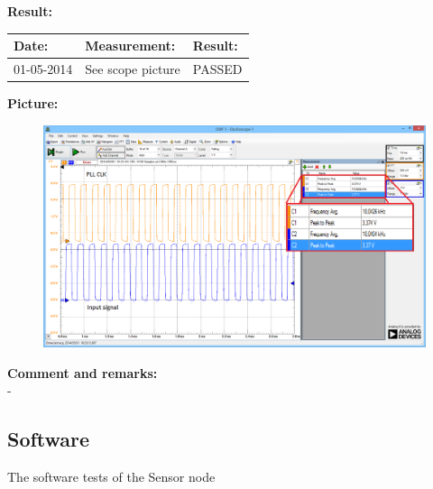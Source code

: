 \textbf{Result:}
\begin{table}[H]
	\centering
	\begin{tabular}{|p{2cm}|p{3cm}|p{2cm}|}\hline
		\textbf{Date:} & \textbf{Measurement:} & \textbf{Result:} \\ \hline
	 	01-05-2014 & See scope picture & PASSED \\ \hline
	\end{tabular}
\end{table}
\textbf{Picture:}
\begin{figure}[H]
\centering
\includegraphics[width=.9\textwidth]{billeder/SN_Case_2_osc_picture}
\end{figure}
\textbf{Comment and remarks:}\\
-\\

\subsection{Software}
The software tests of the Sensor node